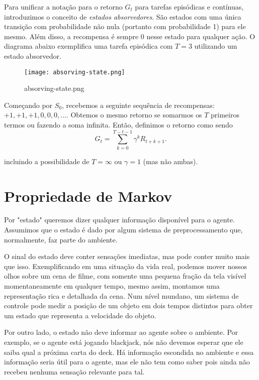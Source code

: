 \documentclass{article}
\begin{document}
Para unificar a notação para o retorno $G_t$ para tarefas episódicas e contínuas, introduzimos o conceito de \textit{estados absorvedores}. São estados com uma única transição com probabilidade não nula (portanto com probabilidade 1) para ele mesmo. Além disso, a recompensa é sempre 0 nesse estado para qualquer ação. O diagrama abaixo exemplifica uma tarefa episódica com $T=3$ utilizando um estado absorvedor. 

\begin{figure}[htpb]
  \centering
  \texttt{[image: absorving-state.png]}
  \caption{absorving-state.png}
  \label{fig:absorving-state-png}
\end{figure}

Começando por $S_0$, recebemos a seguinte sequência de recompensas: $+1,+1,+1,0,0,0,\ldots$. Obtemos o mesmo retorno se somarmos os $T$ primeiros termos ou fazendo a soma infinita. Então, definimos o retorno como sendo 
\[
  G_t=\sum_{k=0}^{T-t-1} {\gamma}^k R_{t+k+1} 
.\]  

incluindo a possibilidade de $T=\infty$ ou $\gamma=1$ (mas não ambas).


\section{Propriedade de Markov}

Por "estado" queremos dizer qualquer informação disponível para o agente. Assumimos que o estado é dado por algum sistema de preprocessamento que, normalmente, faz parte do ambiente. 

O sinal do estado deve conter sensações imediatas, mas pode conter muito mais que isso. Exemplificando em uma situação da vida real, podemos mover nossos olhos sobre um cena de filme, com somente uma pequena fração da tela visível momentaneamente em qualquer tempo, mesmo assim, montamos uma representação rica e detalhada da cena. Num nível mundano, um sistema de controle pode medir a posição de um objeto em dois tempos distintos para obter um estado que representa a velocidade do objeto. 

Por outro lado, o estado não deve informar ao agente  sobre o ambiente. Por exemplo, se o agente está jogando blackjack, nós não devemos esperar que ele saiba qual a próxima carta do deck. Há informação escondida no ambiente e essa informação seria útil para o agente, mas ele não tem como saber pois ainda não recebeu nenhuma sensação relevante para tal. 
\end{document}
